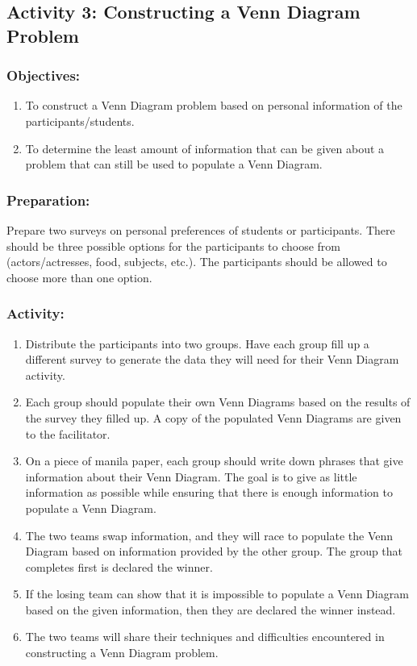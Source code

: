 \subsection*{Activity 3:	Constructing a Venn Diagram Problem}
\subsubsection*{Objectives:}
\begin{enumerate}
\item To construct a Venn Diagram problem based on personal information of the participants/students. 
\item To determine the least amount of information that can be given about a problem that can still be used to populate a Venn Diagram.
\end{enumerate}
\subsubsection*{Preparation:}
Prepare two surveys on personal preferences of students or participants. There should be three possible options for the participants to choose from (actors/actresses, food, subjects, etc.). The participants should be allowed to choose more than one option.
\subsubsection*{Activity:}
\begin{enumerate}
\item Distribute the participants into two groups. Have each group fill up a different survey to generate the data they will need for their Venn Diagram activity.
\item Each group should populate their own Venn Diagrams based on the results of the survey they filled up. A copy of the populated Venn Diagrams are given to the facilitator.
\item On a piece of manila paper, each group should write down phrases that give information about their Venn Diagram. The goal is to give as little information as possible while ensuring that there is enough information to populate a Venn Diagram.
\item The two teams swap information, and they will race to populate the Venn Diagram based on information provided by the other group. The group that completes first is declared the winner.
\item If the losing team can show that it is impossible to populate a Venn Diagram based on the given information, then they are declared the winner instead.
\item The two teams will share their techniques and difficulties encountered in constructing a Venn Diagram problem.
\end{enumerate}
